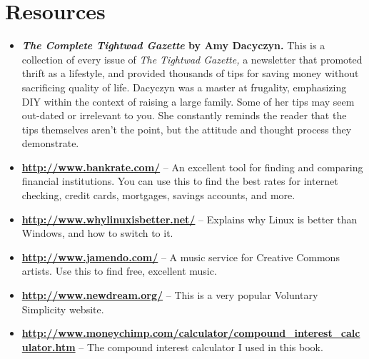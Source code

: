 \section{Resources}
\begin{itemize}
\item \textbf{\emph{The Complete Tightwad Gazette} by Amy Dacyczyn.} This is a collection of every issue of \emph{The Tightwad Gazette,} a newsletter that promoted thrift as a lifestyle, and provided thousands of tips for saving money without sacrificing quality of life. Dacyczyn was a master at frugality, emphasizing DIY within the context of raising a large family. Some of her tips may seem out-dated or irrelevant to you. She constantly reminds the reader that the tips themselves aren't the point, but the attitude and thought process they demonstrate.

\item \textbf{\url{http://www.bankrate.com/}} -- An excellent tool for finding and comparing financial institutions. You can use this to find the best rates for internet checking, credit cards, mortgages, savings accounts, and more.

\item \textbf{\url{http://www.whylinuxisbetter.net/}} -- Explains why Linux is better than Windows, and how to switch to it.

\item \textbf{\url{http://www.jamendo.com/}} -- A music service for Creative Commons artists. Use this to find free, excellent music.

\item \textbf{\url{http://www.newdream.org/}} -- This is a very popular Voluntary Simplicity website.

\item \textbf{\url{http://www.moneychimp.com/calculator/compound\_interest\_calculator.htm}} -- The compound interest calculator I used in this book.
\end{itemize}
